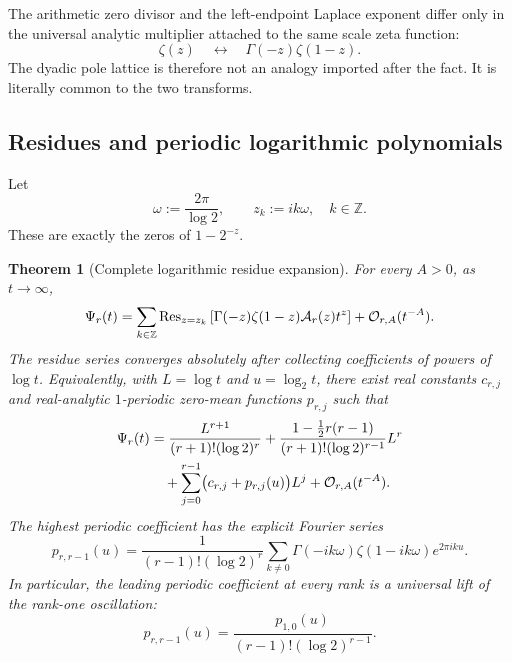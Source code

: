 \documentclass[11pt,oneside]{article}
\newtheorem{theorem}{Theorem}[section]
\theoremstyle{definition}
\theoremstyle{remark}
\newcommand{\Z}{\mathbb Z}
\newcommand{\bigO}{\mathcal O}
\begin{document}
\begin{resultbox}
The arithmetic zero divisor and the left-endpoint Laplace exponent differ only in the universal analytic multiplier attached to the same scale zeta function:
\[
 \zeta(z)\quad\longleftrightarrow\quad\Gamma(-z)\zeta(1-z).
\]
The dyadic pole lattice is therefore not an analogy imported after the fact.  It is literally common to the two transforms.
\end{resultbox}

\subsection{Residues and periodic logarithmic polynomials}

Let
\begin{equation}\label{p3:eq:omega-zk}
  \omega:=\frac{2\pi}{\log2},
  \qquad z_k:=ik\omega,\quad k\in\Z.
\end{equation}
These are exactly the zeros of $1-2^{-z}$.

\begin{theorem}[Complete logarithmic residue expansion]\label{p3:thm:residue-expansion}
For every $A>0$, as $t\to\infty$,
\begin{equation}\label{p3:eq:residue-sum}
 \Psi_r(t)=\sum_{k\in\Z}
 \Res_{z=z_k}\left[
 \Gamma(-z)\zeta(1-z)\mathcal A_r(z)t^z
 \right]+\bigO_{r,A}(t^{-A}).
\end{equation}
The residue series converges absolutely after collecting coefficients of powers of $\log t$.  Equivalently, with $L=\log t$ and $u=\log_2t$, there exist real constants $c_{r,j}$ and real-analytic $1$-periodic zero-mean functions $p_{r,j}$ such that
\begin{align}
 \Psi_r(t)
 &=\frac{L^{r+1}}{(r+1)!(\log2)^r}
 +\frac{1-\frac12r(r-1)}{(r+1)!(\log2)^{r-1}}L^r\notag\\
 &\quad+\sum_{j=0}^{r-1}
 \bigl(c_{r,j}+p_{r,j}(u)\bigr)L^j
 +\bigO_{r,A}(t^{-A}).\label{p3:eq:Psi-periodic-polynomial}
\end{align}
The highest periodic coefficient has the explicit Fourier series
\begin{equation}\label{p3:eq:top-periodic-coefficient}
 p_{r,r-1}(u)=
 \frac1{(r-1)!(\log2)^r}
 \sum_{k\ne0}
 \Gamma(-ik\omega)\zeta(1-ik\omega)e^{2\pi iku}.
\end{equation}
In particular, the leading periodic coefficient at every rank is a universal lift of the rank-one oscillation:
\begin{equation}\label{p3:eq:universal-periodic-lift}
  p_{r,r-1}(u)=
  \frac{p_{1,0}(u)}{(r-1)!(\log2)^{r-1}}.
\end{equation}
\end{theorem}
\end{document}

